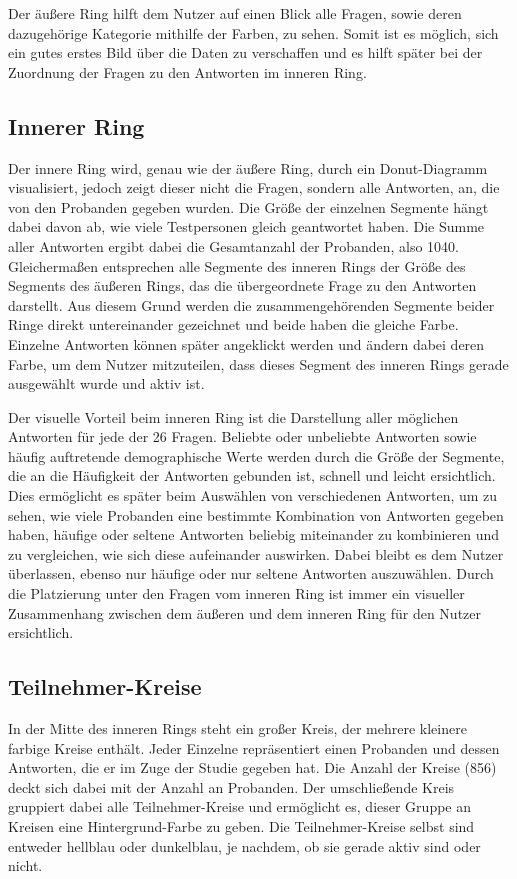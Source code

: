 \documentclass{mi-seminar}
\begin{document}
Der äußere Ring hilft dem Nutzer auf einen Blick alle Fragen, sowie deren dazugehörige Kategorie mithilfe der Farben, zu sehen. Somit ist es möglich, sich ein gutes erstes Bild über die Daten zu verschaffen und es hilft später bei der Zuordnung der Fragen zu den Antworten im inneren Ring. 

\subsection{Innerer Ring}
Der innere Ring wird, genau wie der äußere Ring, durch ein Donut-Diagramm visualisiert, jedoch zeigt dieser nicht die Fragen, sondern alle Antworten, an, die von den Probanden gegeben wurden. Die Größe der einzelnen Segmente hängt dabei davon ab, wie viele Testpersonen gleich geantwortet haben. Die Summe aller Antworten ergibt dabei die Gesamtanzahl der Probanden, also 1040. Gleichermaßen entsprechen alle Segmente des inneren Rings der Größe des Segments des äußeren Rings, das die übergeordnete Frage zu den Antworten darstellt. Aus diesem Grund werden die zusammengehörenden Segmente beider Ringe direkt untereinander gezeichnet und beide haben die gleiche Farbe. Einzelne Antworten können später angeklickt werden und ändern dabei deren Farbe, um dem Nutzer mitzuteilen, dass dieses Segment des inneren Rings gerade ausgewählt wurde und aktiv ist. 

Der visuelle Vorteil beim inneren Ring ist die Darstellung aller möglichen Antworten für jede der 26 Fragen. Beliebte oder unbeliebte Antworten sowie häufig auftretende demographische Werte werden durch die Größe der Segmente, die an die Häufigkeit der Antworten gebunden ist, schnell und leicht ersichtlich. Dies ermöglicht es später beim Auswählen von verschiedenen Antworten, um zu sehen, wie viele Probanden eine bestimmte Kombination von Antworten gegeben haben, häufige oder seltene Antworten beliebig miteinander zu kombinieren und zu vergleichen, wie sich diese aufeinander auswirken. Dabei bleibt es dem Nutzer überlassen, ebenso nur häufige oder nur seltene Antworten auszuwählen. Durch die Platzierung unter den Fragen vom inneren Ring ist immer ein visueller Zusammenhang zwischen dem äußeren und dem inneren Ring für den Nutzer ersichtlich.

\subsection{Teilnehmer-Kreise}
In der Mitte des inneren Rings steht ein großer Kreis, der mehrere kleinere farbige Kreise enthält. Jeder Einzelne repräsentiert einen Probanden und dessen Antworten, die er im Zuge der Studie gegeben hat. Die Anzahl der Kreise (856) deckt sich dabei mit der Anzahl an Probanden. Der umschließende Kreis gruppiert dabei alle Teilnehmer-Kreise und ermöglicht es, dieser Gruppe an Kreisen eine Hintergrund-Farbe zu geben. Die Teilnehmer-Kreise selbst sind entweder hellblau oder dunkelblau, je nachdem, ob sie gerade aktiv sind oder nicht.
\end{document}
